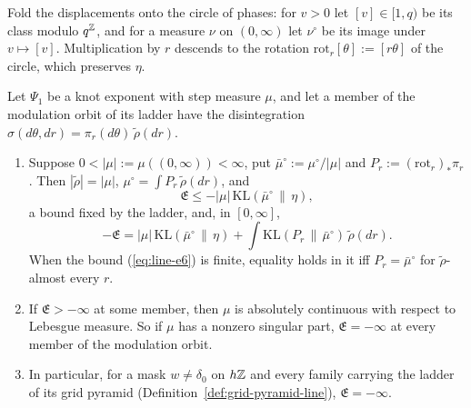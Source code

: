 Fold the displacements onto the circle of phases: for $v > 0$ let $[v] \in [1,q)$ be its class
modulo $q^{\mathbb{Z}}$, and for a measure $\nu$ on $(0,\infty)$ let $\nu^\circ$ be its image under
$v \mapsto [v]$. Multiplication by $r$ descends to the rotation $\mathrm{rot}_r[\theta] := [r\theta]$
of the circle, which preserves $\eta$.

\begin{proposition}
\label{prop:phase-entropy-ladder-bound}
\leanok
{}
Let $\Psi_1$ be a knot exponent with step measure $\mu$, and let a member of the modulation orbit of
its ladder have the disintegration $\sigma(d\theta,dr) = \pi_r(d\theta)\,\tilde\rho(dr)$.
\begin{enumerate}
\item Suppose $0 < |\mu| := \mu((0,\infty)) < \infty$, put $\bar\mu^\circ := \mu^\circ/|\mu|$ and
$P_r := (\mathrm{rot}_r)_*\pi_r$. Then $|\tilde\rho| = |\mu|$, $\mu^\circ = \int P_r\,\tilde\rho(dr)$,
and
\begin{equation}\label{eq:line-e6}
  \mathfrak{E} \le -|\mu|\,\mathrm{KL}(\bar\mu^\circ \,\|\, \eta),
\end{equation}
a bound fixed by the ladder, and, in $[0,\infty]$,
\[
  -\mathfrak{E} = |\mu|\,\mathrm{KL}(\bar\mu^\circ \,\|\, \eta)
  + \int\mathrm{KL}(P_r \,\|\, \bar\mu^\circ)\,\tilde\rho(dr).
\]
When the bound (\ref{eq:line-e6}) is finite, equality holds in it iff $P_r = \bar\mu^\circ$ for
$\tilde\rho$-almost every $r$.
\item If $\mathfrak{E} > -\infty$ at some member, then $\mu$ is absolutely continuous with respect
to Lebesgue measure. So if $\mu$ has a nonzero singular part, $\mathfrak{E} = -\infty$ at every
member of the modulation orbit.
\item In particular, for a mask $w \ne \delta_0$ on $h\mathbb{Z}$ and every family carrying the ladder of
its grid pyramid (Definition~\ref{def:grid-pyramid-line}), $\mathfrak{E} = -\infty$.

\end{enumerate}
\end{proposition}
